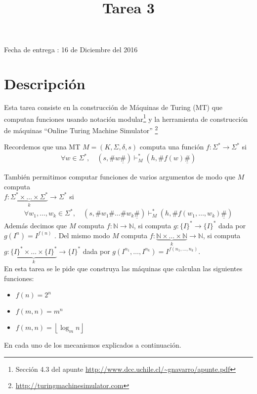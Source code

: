 \documentclass[dcc]{fcfmcourse}
\title{Tarea 3}
\begin{document}
\maketitle
\begin{center}
Fecha de entrega : 16 de Diciembre del 2016
\end{center}
\vspace{-1ex}

\section*{Descripción}
Esta tarea consiste en la construcción de Máquinas de Turing (MT) que computan funciones usando notación modular\footnote{Sección 4.3 del apunte \url{http://www.dcc.uchile.cl/~gnavarro/apunte.pdf} } y la herramienta de construcción de máquinas ``Online Turing Machine Simulator'' \footnote{\url{http://turingmachinesimulator.com}}


Recordemos que una MT $M = (K,\Sigma,\delta, s)$ computa una función $f\colon \Sigma^* \to \Sigma^*$ si
\begin{align*}
\forall w \in \Sigma^* ,\quad (s,\# w\underline{\# }) \vdash_{M}^* (h, \# f(w) \underline{\#})
\end{align*}

También permitimos computar funciones de varios argumentos de modo que $M$ computa\\ $f\colon \underbrace{\Sigma^* \times \ldots \times \Sigma^*}_{k} \to \Sigma^*$ si 
\begin{align*}
\forall w_{1},\ldots,w_{k} \in \Sigma^* ,\quad (s,\# w_{1}\#\ldots\# w_{k}\underline{\# }) \vdash_{M}^* (h, \# f(w_{1},\ldots,w_{k}) \underline{\#})
\end{align*}
Además decimos que $M$ computa $f\colon \mathbb{N} \to \mathbb{N}$, si computa $g\colon \{I\}^* \to \{I\}^*$ dada por $g(I^{n}) = I^{f(n)}$ . Del mismo modo $M$ computa $f\colon \underbrace{\mathbb{N}\times \ldots \times \mathbb{N}}_{k} \to \mathbb{N}$, si computa $g\colon \underbrace{\{I\}^* \times \ldots \times \{I\}^*}_{k} \to \{I\}^*$ dada por $g(I^{n_{1}},\ldots, I^{n_{k}}) = I^{f(n_{1},\ldots,  n_{k})}$.\\

En esta tarea se le pide que construya las máquinas que calculan las siguientes funciones:
\begin{itemize}
\item $f(n) = 2^n$
\item $f(m,n) = m^n$
\item $f(m,n) = \left \lfloor{\log_{m} n}\right \rfloor $
\end{itemize}
En cada uno de los mecanismos explicados a continuación.
\end{document}
